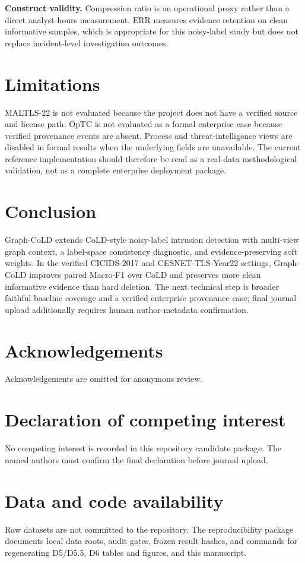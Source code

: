 \documentclass[preprint,review,12pt]{elsarticle}
\begin{document}
\textbf{Construct validity.} Compression ratio is an operational proxy rather
than a direct analyst-hours measurement. ERR measures evidence retention on clean
informative samples, which is appropriate for this noisy-label study but does
not replace incident-level investigation outcomes.

\section{Limitations}
MALTLS-22 is not evaluated because the project does not have a verified source
and license path. OpTC is not evaluated as a formal enterprise case because
verified provenance events are absent. Process and threat-intelligence views are
disabled in formal results when the underlying fields are unavailable. The
current reference implementation should therefore be read as a real-data
methodological validation, not as a complete enterprise deployment package.

\section{Conclusion}
Graph-CoLD extends CoLD-style noisy-label intrusion detection with multi-view
graph context, a label-space consistency diagnostic, and evidence-preserving
soft weights. In the verified CICIDS-2017 and CESNET-TLS-Year22 settings,
Graph-CoLD improves paired Macro-F1 over CoLD and preserves more clean
informative evidence than hard deletion. The next technical step is broader faithful baseline coverage and a verified
enterprise provenance case; final journal upload additionally requires human
author-metadata confirmation.

\section*{Acknowledgements}
Acknowledgements are omitted for anonymous review.

\section*{Declaration of competing interest}
No competing interest is recorded in this repository candidate package. The named
authors must confirm the final declaration before journal upload.

\section*{Data and code availability}
Raw datasets are not committed to the repository. The reproducibility package
documents local data roots, audit gates, frozen result hashes, and commands for
regenerating D5/D5.5, D6 tables and figures, and this manuscript.



\end{document}
